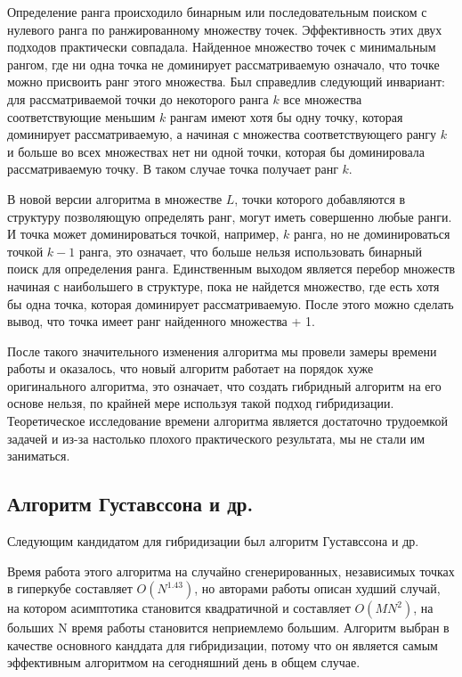 Определение ранга происходило бинарным или последовательным поиском с нулевого ранга по ранжированному множеству точек. Эффективность этих двух подходов практически совпадала. Найденное множество точек с минимальным рангом, где ни одна точка не доминирует рассматриваемую означало, что точке можно присвоить ранг этого множества. Был справедлив следующий инвариант: для рассматриваемой точки до некоторого ранга $k$ все множества соответствующие меньшим $k$ рангам имеют хотя бы одну точку, которая доминирует рассматриваемую, а начиная с множества соответствующего рангу $k$ и больше во всех множествах нет ни одной точки, которая бы доминировала рассматриваемую точку. В таком случае точка получает ранг $k$. 

В новой версии алгоритма в множестве $L$, точки которого добавляются в структуру позволяющую определять ранг, могут иметь совершенно любые ранги. И точка может доминироваться точкой, например, $k$ ранга, но не доминироваться точкой $k-1$ ранга, это означает, что больше нельзя использовать бинарный поиск для определения ранга. Единственным выходом является перебор множеств начиная с наибольшего в структуре, пока не найдется множество, где есть хотя бы одна точка, которая доминирует рассматриваемую. После этого можно сделать вывод, что точка имеет ранг найденного множества + 1. 

После такого значительного изменения алгоритма мы провели замеры времени работы и оказалось, что новый алгоритм работает на порядок хуже оригинального алгоритма, это означает, что создать гибридный алгоритм на его основе нельзя, по крайней мере используя такой подход гибридизации. Теоретическое исследование времени алгоритма является достаточно трудоемкой задачей и из-за настолько плохого практического результата, мы не стали им заниматься. 

\subsection{Алгоритм Густавссона и др.}

Следующим кандидатом для гибридизации был алгоритм Густавссона и др. 

Время работа этого алгоритма на случайно сгенерированных, независимых точках в гиперкубе составляет $O(N^{1.43})$, но авторами работы описан худший случай, на котором асимптотика становится квадратичной и составляет $O(MN^2)$, на больших N время работы становится неприемлемо большим. Алгоритм выбран в качестве основного канддата для гибридизации, потому что он является самым эффективным алгоритмом на сегодняшний день в общем случае. 

